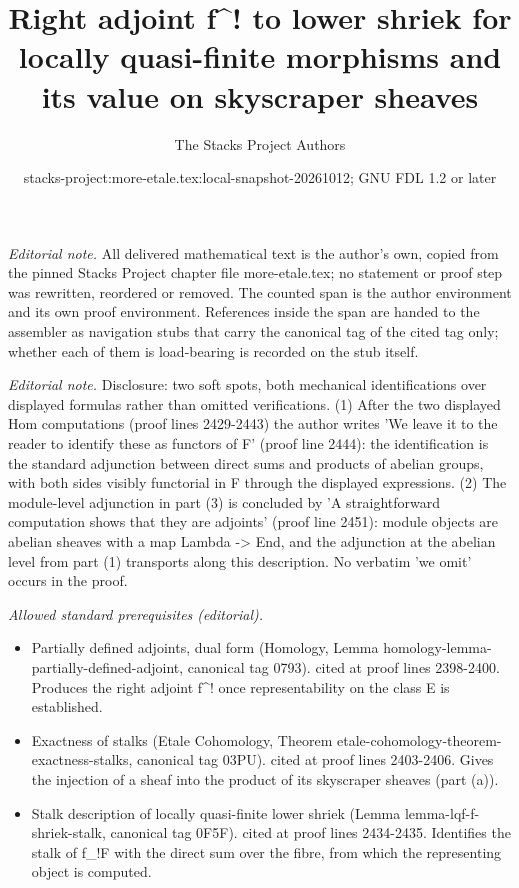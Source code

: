 \documentclass{stacks-project}
\title{Right adjoint f\textasciicircum{}! to lower shriek for locally quasi-finite morphisms and its value on skyscraper sheaves}
\author{The Stacks Project Authors}
\date{stacks-project:more-etale.tex:local-snapshot-20261012; GNU FDL 1.2 or later}
\theoremstyle{plain}
\theoremstyle{definition}
\theoremstyle{remark}
\numberwithin{equation}{subsection}
\begin{document}
\maketitle
\setcounter{subsection}{1}
\noindent\textit{Editorial note.} All delivered mathematical text is the author's own, copied from the pinned Stacks Project chapter file more-etale.tex; no statement or proof step was rewritten, reordered or removed. The counted span is the author environment and its own proof environment. References inside the span are handed to the assembler as navigation stubs that carry the canonical tag of the cited tag only; whether each of them is load-bearing is recorded on the stub itself.\par\medskip
\noindent\textit{Editorial note.} Disclosure: two soft spots, both mechanical identifications over displayed formulas rather than omitted verifications. (1) After the two displayed Hom computations (proof lines 2429-2443) the author writes 'We leave it to the reader to identify these as functors of F' (proof line 2444): the identification is the standard adjunction between direct sums and products of abelian groups, with both sides visibly functorial in F through the displayed expressions. (2) The module-level adjunction in part (3) is concluded by 'A straightforward computation shows that they are adjoints' (proof line 2451): module objects are abelian sheaves with a map Lambda -> End, and the adjunction at the abelian level from part (1) transports along this description. No verbatim 'we omit' occurs in the proof.\par\medskip
\noindent\textit{Allowed standard prerequisites (editorial).}\begin{itemize}
\item Partially defined adjoints, dual form (Homology, Lemma homology-lemma-partially-defined-adjoint, canonical tag 0793). cited at proof lines 2398-2400. Produces the right adjoint f\textasciicircum{}! once representability on the class E is established.
\item Exactness of stalks (Etale Cohomology, Theorem etale-cohomology-theorem-exactness-stalks, canonical tag 03PU). cited at proof lines 2403-2406. Gives the injection of a sheaf into the product of its skyscraper sheaves (part (a)).
\item Stalk description of locally quasi-finite lower shriek (Lemma lemma-lqf-f-shriek-stalk, canonical tag 0F5F). cited at proof lines 2434-2435. Identifies the stalk of f\_!F with the direct sum over the fibre, from which the representing object is computed.
\end{itemize}\medskip
\end{document}
